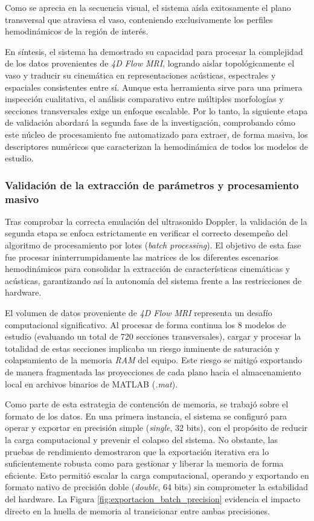 Como se aprecia en la secuencia visual, el sistema aísla exitosamente el plano transversal que atraviesa el vaso, conteniendo exclusivamente los perfiles hemodinámicos de la región de interés. 

En síntesis, el sistema ha demostrado su capacidad para procesar la complejidad de los datos provenientes de \textit{4D Flow MRI}, logrando aislar topológicamente el vaso y traducir su cinemática en representaciones acústicas, espectrales y espaciales consistentes entre sí. Aunque esta herramienta sirve para una primera inspección cualitativa, el análisis comparativo entre múltiples morfologías y secciones transversales exige un enfoque escalable. Por lo tanto, la siguiente etapa de validación abordará la segunda fase de la investigación, comprobando cómo este núcleo de procesamiento fue automatizado para extraer, de forma masiva, los descriptores numéricos que caracterizan la hemodinámica de todos los modelos de estudio.

\subsubsection{Validación de la extracción de parámetros y procesamiento masivo}

Tras comprobar la correcta emulación del ultrasonido Doppler, la validación de la segunda etapa se enfoca estrictamente en verificar el correcto desempeño del algoritmo de procesamiento por lotes (\textit{batch processing}). El objetivo de esta fase fue procesar ininterrumpidamente las matrices de los diferentes escenarios hemodinámicos para consolidar la extracción de características cinemáticas y acústicas, garantizando así la autonomía del sistema frente a las restricciones de hardware.

El volumen de datos proveniente de \textit{4D Flow MRI} representa un desafío computacional significativo. Al procesar de forma continua los 8 modelos de estudio (evaluando un total de 720 secciones transversales), cargar y procesar la totalidad de estas secciones implicaba un riesgo inminente de saturación y colapsamiento de la memoria \textit{RAM} del equipo. Este riesgo se mitigó exportando de manera fragmentada las proyecciones de cada plano hacia el almacenamiento local en archivos binarios de MATLAB (\textit{.mat}).

Como parte de esta estrategia de contención de memoria, se trabajó sobre el formato de los datos. En una primera instancia, el sistema se configuró para operar y exportar en precisión simple (\textit{single}, 32 bits), con el propósito de reducir la carga computacional y prevenir el colapso del sistema. No obstante, las pruebas de rendimiento demostraron que la exportación iterativa era lo suficientemente robusta como para gestionar y liberar la memoria de forma eficiente. Esto permitió escalar la carga computacional, operando y exportando en formato nativo de precisión doble (\textit{double}, 64 bits) sin comprometer la estabilidad del hardware. La Figura \ref{fig:exportacion_batch_precision} evidencia el impacto directo en la huella de memoria al transicionar entre ambas precisiones.


